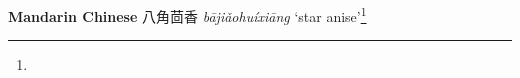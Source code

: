 \begin{etymology}\label{ety:bajiaohuixiang}
\textbf{Mandarin Chinese} {八角茴香} \textit{bājiǎohuíxiāng} `star anise'\footnote{}
\end{etymology}